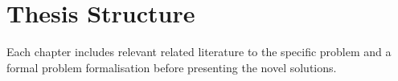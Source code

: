 % 
%                                                                    
%                                                                    
%                                                                    
% 
\section{Thesis Structure}

Each chapter includes relevant related literature to the specific problem and a formal problem formalisation before presenting the novel solutions.